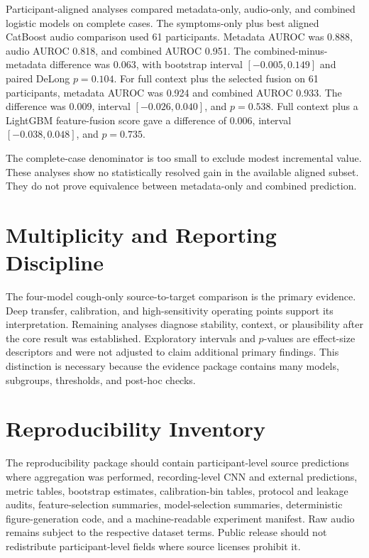 \documentclass[journal]{IEEEtran}
\begin{document}
Participant-aligned analyses compared metadata-only, audio-only, and combined logistic models on complete cases. The symptoms-only plus best aligned CatBoost audio comparison used 61 participants. Metadata AUROC was 0.888, audio AUROC 0.818, and combined AUROC 0.951. The combined-minus-metadata difference was 0.063, with bootstrap interval $[-0.005,0.149]$ and paired DeLong $p=0.104$. For full context plus the selected fusion on 61 participants, metadata AUROC was 0.924 and combined AUROC 0.933. The difference was 0.009, interval $[-0.026,0.040]$, and $p=0.538$. Full context plus a LightGBM feature-fusion score gave a difference of 0.006, interval $[-0.038,0.048]$, and $p=0.735$.

The complete-case denominator is too small to exclude modest incremental value. These analyses show no statistically resolved gain in the available aligned subset. They do not prove equivalence between metadata-only and combined prediction.

\section{Multiplicity and Reporting Discipline}

The four-model cough-only source-to-target comparison is the primary evidence. Deep transfer, calibration, and high-sensitivity operating points support its interpretation. Remaining analyses diagnose stability, context, or plausibility after the core result was established. Exploratory intervals and $p$-values are effect-size descriptors and were not adjusted to claim additional primary findings. This distinction is necessary because the evidence package contains many models, subgroups, thresholds, and post-hoc checks.

\section{Reproducibility Inventory}

The reproducibility package should contain participant-level source predictions where aggregation was performed, recording-level CNN and external predictions, metric tables, bootstrap estimates, calibration-bin tables, protocol and leakage audits, feature-selection summaries, model-selection summaries, deterministic figure-generation code, and a machine-readable experiment manifest. Raw audio remains subject to the respective dataset terms. Public release should not redistribute participant-level fields where source licenses prohibit it.



\end{document}
